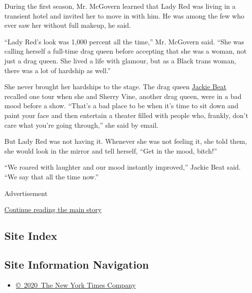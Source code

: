During the first season, Mr. McGovern learned that Lady Red was living
in a transient hotel and invited her to move in with him. He was among
the few who ever saw her without full makeup, he said.

``Lady Red's look was 1,000 percent all the time,'' Mr. McGovern said.
``She was calling herself a full-time drag queen before accepting that
she was a woman, not just a drag queen. She lived a life with glamour,
but as a Black trans woman, there was a lot of hardship as well.''

She never brought her hardships to the stage. The drag queen
\href{http://www.missjackiebeat.com/}{Jackie Beat} recalled one tour
when she and Sherry Vine, another drag queen, were in a bad mood before
a show. ``That's a bad place to be when it's time to sit down and paint
your face and then entertain a theater filled with people who, frankly,
don't care what you're going through,'' she said by email.

But Lady Red was not having it. Whenever she was not feeling it, she
told them, she would look in the mirror and tell herself, ``Get in the
mood, bitch!''

``We roared with laughter and our mood instantly improved,'' Jackie Beat
said. ``We say that all the time now.''

Advertisement

\protect\hyperlink{after-bottom}{Continue reading the main story}

\hypertarget{site-index}{%
\subsection{Site Index}\label{site-index}}

\hypertarget{site-information-navigation}{%
\subsection{Site Information
Navigation}\label{site-information-navigation}}

\begin{itemize}
\tightlist
\item
  \href{https://help.nytimes.com/hc/en-us/articles/115014792127-Copyright-notice}{©~2020~The
  New York Times Company}
\end{itemize}

